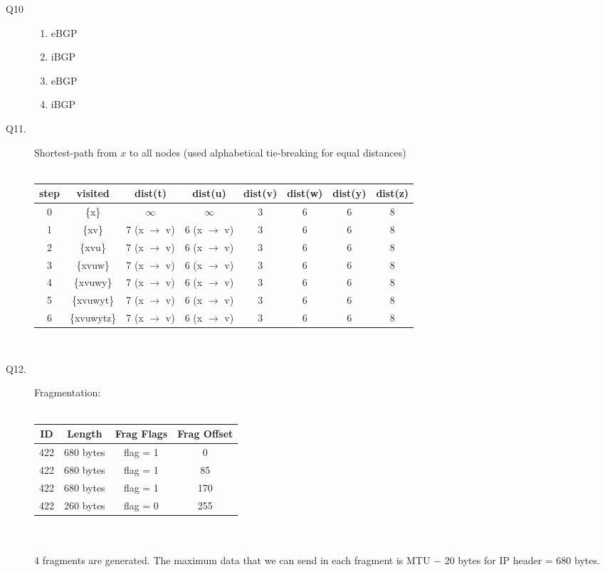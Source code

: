 \documentclass{csc_assignment}
\begin{document}
\begin{description}
\newpage
\item[Q10] 
\begin{enumerate}
\item eBGP
\item iBGP
\item eBGP
\item iBGP
\end{enumerate}


\item[Q11.] Shortest-path from $x$ to all nodes (used alphabetical tie-breaking for equal distances)\\\\
\begin{tabular}{ |c|c|c|c|c|c|c|c| }
\hline
	 step & visited & dist(t) & dist(u) & dist(v) & dist(w) & dist(y) & dist(z) \\
	\hline
	0 & \{x\} & $\infty$ & $\infty$ & 3 & 6 & 6 & 8 \\
	\hline
	1 & \{xv\} & 7 (x $\rightarrow$ v) & 6 (x $\rightarrow$ v) & 3 & 6 & 6 & 8 \\
	\hline
	2 & \{xvu\} & 7 (x $\rightarrow$ v) & 6 (x $\rightarrow$ v) & 3 & 6 & 6 & 8 \\
	\hline
	3 & \{xvuw\} & 7 (x $\rightarrow$ v) & 6 (x $\rightarrow$ v) & 3 & 6 & 6 & 8 \\
	\hline
	4 & \{xvuwy\} & 7 (x $\rightarrow$ v) & 6 (x $\rightarrow$ v) & 3 & 6 & 6 & 8 \\
	\hline
	5 & \{xvuwyt\} & 7 (x $\rightarrow$ v) & 6 (x $\rightarrow$ v) & 3 & 6 & 6 & 8 \\
	\hline
	6 & \{xvuwytz\} & 7 (x $\rightarrow$ v) & 6 (x $\rightarrow$ v) & 3 & 6 & 6 & 8 \\
	\hline
\end{tabular} \\


\item[Q12.] Fragmentation: \\\\
\begin{tabular}{ |c|c|c|c| }
\hline
	 ID & Length & Frag Flags & Frag Offset \\
	\hline
	422 & 680 bytes & flag = 1 & 0 \\
	\hline
	422 & 680 bytes & flag = 1 & 85 \\
	\hline
	422 & 680 bytes & flag = 1 & 170 \\
	\hline
	422 & 260 bytes & flag = 0 & 255 \\
	\hline
\end{tabular} \\\\
4 fragments are generated. The maximum data that we can send in each fragment is MTU $-$ 20 bytes for IP header = 680 bytes. 
  

\end{description}
\end{document}
